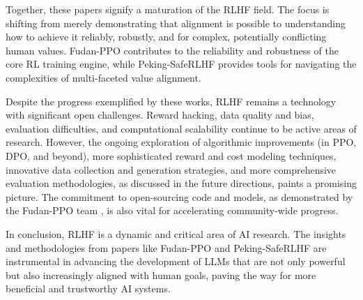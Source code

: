 \documentclass[10pt,journal,compsoc]{IEEEtran} %
\begin{document}
Together, these papers signify a maturation of the RLHF field. The focus is shifting from merely demonstrating that alignment is possible to understanding how to achieve it reliably, robustly, and for complex, potentially conflicting human values. Fudan-PPO contributes to the reliability and robustness of the core RL training engine, while Peking-SafeRLHF provides tools for navigating the complexities of multi-faceted value alignment.

Despite the progress exemplified by these works, RLHF remains a technology with significant open challenges. Reward hacking, data quality and bias, evaluation difficulties, and computational scalability continue to be active areas of research. However, the ongoing exploration of algorithmic improvements (in PPO, DPO, and beyond), more sophisticated reward and cost modeling techniques, innovative data collection and generation strategies, and more comprehensive evaluation methodologies, as discussed in the future directions, paints a promising picture. The commitment to open-sourcing code and models, as demonstrated by the Fudan-PPO team , is also vital for accelerating community-wide progress.  

In conclusion, RLHF is a dynamic and critical area of AI research. The insights and methodologies from papers like Fudan-PPO and Peking-SafeRLHF are instrumental in advancing the development of LLMs that are not only powerful but also increasingly aligned with human goals, paving the way for more beneficial and trustworthy AI systems.


\end{document}
